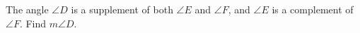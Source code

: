 The angle $\angle D$ is a supplement of both $\angle E$ and $\angle F$, and $\angle E$ is a complement of $\angle F$. Find $m\angle D$.
